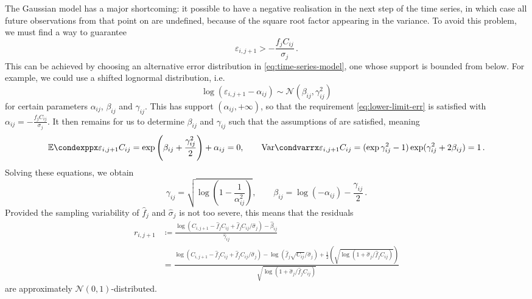\documentclass[a4paper]{book}
\begin{document}
The Gaussian model has a major shortcoming: it possible to have a negative realisation in the next step of the time series, in which case all future observations from that point on are undefined, because of the square root factor appearing in the variance. To avoid this problem, we must find a way to guarantee
\begin{equation} \label{eq:lower-limit-err}
  \varepsilon_{i, j + 1} > -\frac{f_j C_{ij}}{\sigma_j} \,.
\end{equation}
This can be achieved by choosing an alternative error distribution in \cref{eq:time-series-model}, one whose support is bounded from below. For example, we could use a shifted lognormal distribution, i.e.
\begin{equation}
  \log(\varepsilon_{i, j + 1} - \alpha_{ij}) \sim \mathcal{N}(\beta_{ij}, \gamma_{ij}^2)
\end{equation} 
for certain parameters $\alpha_{ij}$, $\beta_{ij}$ and $\gamma_{ij}$. This has support $(\alpha_{ij}, +\infty)$, so that the requirement \cref{eq:lower-limit-err} is satisfied with $\alpha_{ij} = -\frac{f_j C_{ij}}{\sigma_j}$. It then remains for us to determine $\beta_{ij}$ and $\gamma_{ij}$ such that the assumptions of  are satisfied, meaning
\begin{equation}
  \condexpp{\varepsilon_{i, j + 1}}{C_{ij}} = \exp \left( \beta_{ij} + \frac{\gamma_{ij}^2}{2} \right) + \alpha_{ij} = 0, \qquad \condvarr{\varepsilon_{i, j + 1}}{C_{ij}} = (\exp{\gamma_{ij}^2} - 1) \exp(\gamma_{ij}^2 + 2 \beta_{ij}) = 1 \,.
\end{equation}
Solving these equations, we obtain
\begin{equation}
  \gamma_{ij} = \sqrt{\log \left( 1 - \frac{1}{\alpha^2_{ij}} \right)}, \qquad \beta_{ij} = \log(-\alpha_{ij}) - \frac{\gamma_{ij}}{2} \,.
\end{equation}
Provided the sampling variability of $\widehat{f}_j$ and $\widehat{\sigma}_j$ is not too severe, this means that the residuals
\begin{align}
  r_{i, j + 1} 
  &\coloneqq \frac{\log \left( C_{i, j + 1} - \widehat{f}_j C_{ij} + \widehat{f}_j C_{ij} / \widehat{\sigma}_j \right) - \widehat{\beta}_{ij}}{\widehat{\gamma}_{ij}} \\
  &= \frac{\log \left( C_{i, j + 1} - \widehat{f}_j C_{ij} + \widehat{f}_j C_{ij} / \widehat{\sigma}_j \right) - \log(\widehat{f}_j \sqrt{C_{ij}} / \widehat{\sigma}_j) + \frac{1}{2} \left( \sqrt{\log \left( 1 + \widehat{\sigma}_j / \widehat{f}_j C_{ij} \right)} \right)}{\sqrt{\log \left( 1 + \widehat{\sigma}_j / \widehat{f}_j C_{ij} \right)}}
\end{align}
are approximately $\mathcal{N}(0, 1)$-distributed.
\end{document}
